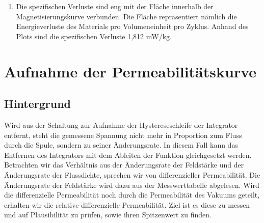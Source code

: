 \documentclass[a4paper,twoside,12pt,DIV=13,BCOR=5mm,numbers=noenddot,cleardoublepage=empty]{scrbook}
\begin{document}
\begin{enumerate}
            \\
            
            \item Die spezifischen Verluste sind eng mit der Fläche innerhalb der Magnetisierungskurve verbunden. Die Fläche repräsentiert nämlich die Energieverluste des Materials pro Volumeneinheit pro Zyklus. Anhand des Plots sind die spezifischen Verluste 1,812 mW/kg.
        
        \end{enumerate}
    




        \section{Aufnahme der Permeabilit\"atskurve}
        \subsection{Hintergrund}
        Wird aus der Schaltung zur Aufnahme der Hystereseschleife der Integrator entfernt, steht die gemessene Spannung nicht mehr in Proportion 
        zum Fluss durch die Spule, sondern zu seiner \"Anderungsrate. In diesem Fall kann das Entfernen des Integrators mit dem Ableiten der Funktion
        gleichgesetzt werden. Betrachten wir das Verh\"altnis aus der \"Anderungsrate der Feldst\"arke und der \"Anderungsrate der Flussdichte, sprechen wir von 
        differenzieller Permeabilit\"at. Die \"Anderungsrate der Feldstärke wird dazu aus der Messwerttabelle abgelesen. Wird die differenzielle Permeabilit\"at noch durch die Permeabilit\"at des Vakuums geteilt, erhalten wir die relative differenzielle Permeabilit\"at. Ziel ist es diese zu messen 
        und auf Plausibilit\"at zu pr\"ufen, sowie ihren Spitzenwert zu finden.
\end{document}
